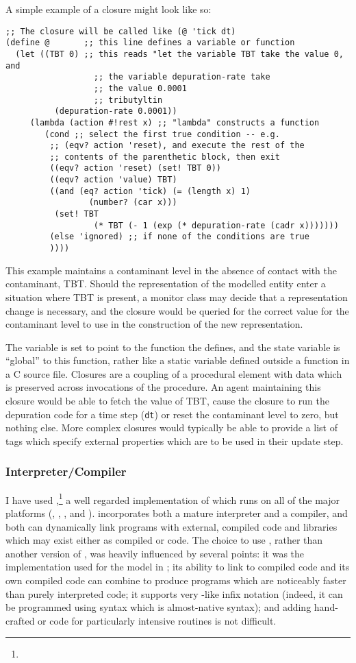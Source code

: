 A simple example of a closure might look like so:
\begin{verbatim}
;; The closure will be called like (@ 'tick dt) 
(define @       ;; this line defines a variable or function
  (let ((TBT 0) ;; this reads "let the variable TBT take the value 0, and 
		          ;; the variable depuration-rate take                  
		          ;; the value 0.0001
		          ;; tributyltin 
		  (depuration-rate 0.0001))
	 (lambda (action #!rest x) ;; "lambda" constructs a function
		(cond ;; select the first true condition -- e.g. 
		 ;; (eqv? action 'reset), and execute the rest of the
		 ;; contents of the parenthetic block, then exit
		 ((eqv? action 'reset) (set! TBT 0))
		 ((eqv? action 'value) TBT)
		 ((and (eq? action 'tick) (= (length x) 1) 
				 (number? (car x)))
		  (set! TBT 
				  (* TBT (- 1 (exp (* depuration-rate (cadr x)))))))
		 (else 'ignored) ;; if none of the conditions are true
		 ))))
\end{verbatim}
This example maintains a contaminant level in the absence of contact
with the contaminant, TBT.  Should the representation of the
modelled entity enter a situation where TBT is present, a monitor
class may decide that a representation change is necessary, and the
closure would be queried for the correct value for the contaminant
level to use in the construction of the new representation.

The variable  is set to point to the function the
 defines, and the state variable  is
``global'' to this function, rather like a static variable defined
outside a function in a C source file. Closures are a coupling of a
procedural element with data which is preserved across invocations of
the procedure. An agent maintaining this closure would be able to
fetch the value of TBT, cause the closure to run the depuration code
for a time step (\texttt{dt}) or reset the contaminant level to zero,
but nothing else.  More complex closures would typically be able to
provide a list of tags which specify external properties which are to
be used in their update step.

\subsubsection{Interpreter/Compiler}
I have used
\GambitC,\footnote{} a well
regarded implementation of \Scheme which runs on all of the major
platforms (\Linux, \Unix, \OSX, \Android and \Windows). \Gambit
incorporates both a mature \Scheme interpreter and a compiler, and
both can dynamically link programs with external, compiled code and
libraries which may exist either as compiled \CC or \Scheme code.  The
choice to use \Gambit, rather than another version of \Scheme, was
heavily influenced by several points: it was the implementation used
for the model in \Ctwo; its ability to link to compiled \CC code and
its own compiled code can combine to produce programs which are
noticeably faster than purely interpreted code; it supports
very \CC-like infix notation (indeed, it can be programmed using
syntax which is almost-native \CC syntax); and adding hand-crafted \CC
or \Cpp code for particularly intensive routines is not difficult.

